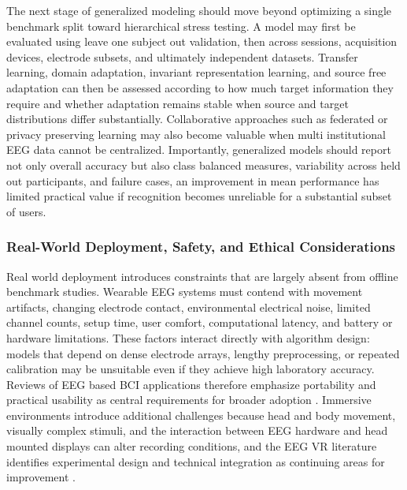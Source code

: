 \documentclass[ASNA,twocolumn]{USG}
\begin{document}
The next stage of generalized modeling should move beyond optimizing a single benchmark split toward hierarchical stress testing. A model may first be evaluated using leave one subject out validation, then across sessions, acquisition devices, electrode subsets, and ultimately independent datasets. Transfer learning, domain adaptation, invariant representation learning, and source free adaptation can then be assessed according to how much target information they require and whether adaptation remains stable when source and target distributions differ substantially. Collaborative approaches such as federated or privacy preserving learning may also become valuable when multi institutional EEG data cannot be centralized. Importantly, generalized models should report not only overall accuracy but also class balanced measures, variability across held out participants, and failure cases, an improvement in mean performance has limited practical value if recognition becomes unreliable for a substantial subset of users.

\subsubsection{Real-World Deployment, Safety, and Ethical Considerations}
\label{subsubsec:practical_application_challenges}

Real world deployment introduces constraints that are largely absent from offline benchmark studies. Wearable EEG systems must contend with movement artifacts, changing electrode contact, environmental electrical noise, limited channel counts, setup time, user comfort, computational latency, and battery or hardware limitations. These factors interact directly with algorithm design: models that depend on dense electrode arrays, lengthy preprocessing, or repeated calibration may be unsuitable even if they achieve high laboratory accuracy. Reviews of EEG based BCI applications therefore emphasize portability and practical usability as central requirements for broader adoption \cite{varbu2022past}. Immersive environments introduce additional challenges because head and body movement, visually complex stimuli, and the interaction between EEG hardware and head mounted displays can alter recording conditions, and the EEG VR literature identifies experimental design and technical integration as continuing areas for improvement \cite{choi2023neural}.
\end{document}
